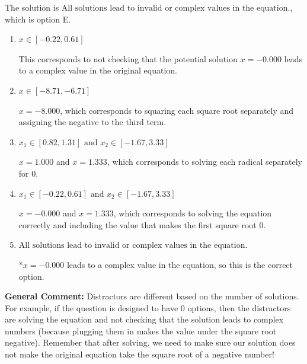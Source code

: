 \documentclass{extbook}[14pt]
\begin{document}
\begin{enumerate}
{The solution is \( \text{All solutions lead to invalid or complex values in the equation.} \), which is option E.\begin{enumerate}[label=\Alph*.]
\item \( x \in [-0.22,0.61] \)

This corresponds to not checking that the potential solution $x = -0.000$ leads to a complex value in the original equation.
\item \( x \in [-8.71,-6.71] \)

$x = -8.000$, which corresponds to squaring each square root separately and assigning the negative to the third term.
\item \( x_1 \in [0.82, 1.31] \text{ and } x_2 \in [-1.67,3.33] \)

$x = 1.000$ and $x = 1.333$, which corresponds to solving each radical separately for 0.
\item \( x_1 \in [-0.22, 0.61] \text{ and } x_2 \in [-1.67,3.33] \)

$x = -0.000$ and $x = 1.333$, which corresponds to solving the equation correctly and including the value that makes the first square root 0.
\item \( \text{All solutions lead to invalid or complex values in the equation.} \)

*$x = -0.000$ leads to a complex value in the equation, so this is the correct option.
\end{enumerate}

\textbf{General Comment:} Distractors are different based on the number of solutions. For example, if the question is designed to have 0 options, then the distractors are solving the equation and not checking that the solution leads to complex numbers (because plugging them in makes the value under the square root negative). Remember that after solving, we need to make sure our solution does not make the original equation take the square root of a negative number!
}
\end{enumerate}
\end{document}
